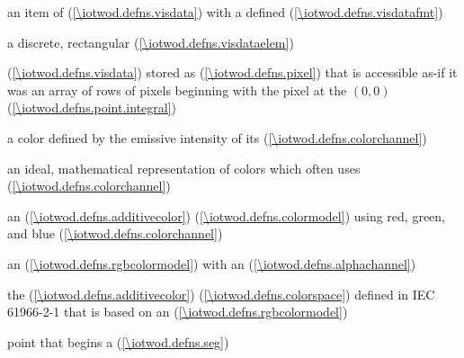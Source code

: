 %
an item of  (\ref{\iotwod.defns.visdata}) with a defined  (\ref{\iotwod.defns.visdatafmt})

a discrete, rectangular  (\ref{\iotwod.defns.visdataelem})

%
%
  (\ref{\iotwod.defns.visdata}) stored as  (\ref{\iotwod.defns.pixel}) that is accessible as-if it was an array of rows of pixels beginning with the pixel at the  $(0,0)$ (\ref{\iotwod.defns.point.integral})

%
a color defined by the emissive intensity of its  (\ref{\iotwod.defns.colorchannel})

%
an ideal, mathematical representation of colors which often uses  (\ref{\iotwod.defns.colorchannel})

%
%
 an  (\ref{\iotwod.defns.additivecolor})  (\ref{\iotwod.defns.colormodel}) using red, green, and blue  (\ref{\iotwod.defns.colorchannel})

%
%
 an  (\ref{\iotwod.defns.rgbcolormodel}) with an  (\ref{\iotwod.defns.alphachannel})

%
%
 the  (\ref{\iotwod.defns.additivecolor})  (\ref{\iotwod.defns.colorspace}) defined in IEC 61966-2-1 that is based on an  (\ref{\iotwod.defns.rgbcolormodel})

%
point that begins a  (\ref{\iotwod.defns.seg})

